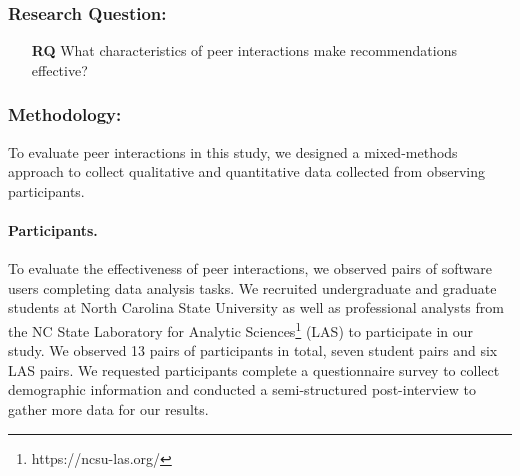 
\subsubsection{Research Question:}

\begin{itemize}
  \item[\textbf{RQ}] What characteristics of peer interactions make recommendations effective?
\end{itemize}

\subsubsection{Methodology:}

To evaluate peer interactions in this study, we designed a mixed-methods approach to collect qualitative and quantitative data collected from observing participants.

\paragraph{Participants.} To evaluate the effectiveness of peer interactions, we observed pairs of software users completing data analysis tasks. We recruited undergraduate and graduate students at North Carolina State University as well as professional analysts from the NC State Laboratory for Analytic Sciences\footnote{https://ncsu-las.org/} (LAS) to participate in our study. We observed 13 pairs of participants in total, seven student pairs and six LAS pairs. We requested participants complete a questionnaire survey to collect demographic information and conducted a semi-structured post-interview to gather more data for our results. 

